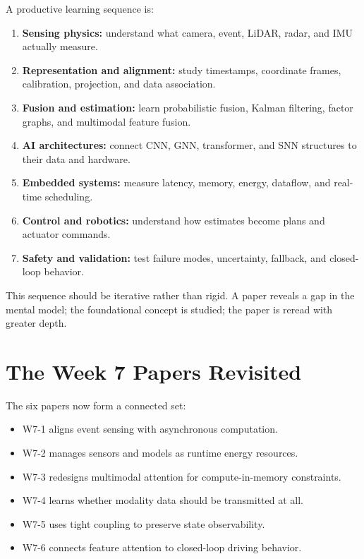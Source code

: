 A productive learning sequence is:

\begin{enumerate}[label=\arabic*.]
    \item \textbf{Sensing physics:} understand what camera, event, LiDAR, radar, and IMU actually measure.
    \item \textbf{Representation and alignment:} study timestamps, coordinate frames, calibration, projection, and data association.
    \item \textbf{Fusion and estimation:} learn probabilistic fusion, Kalman filtering, factor graphs, and multimodal feature fusion.
    \item \textbf{AI architectures:} connect CNN, GNN, transformer, and SNN structures to their data and hardware.
    \item \textbf{Embedded systems:} measure latency, memory, energy, dataflow, and real-time scheduling.
    \item \textbf{Control and robotics:} understand how estimates become plans and actuator commands.
    \item \textbf{Safety and validation:} test failure modes, uncertainty, fallback, and closed-loop behavior.
\end{enumerate}

This sequence should be iterative rather than rigid. A paper reveals a gap in the mental model; the foundational concept is studied; the paper is reread with greater depth.

\section{The Week 7 Papers Revisited}

The six papers now form a connected set:

\begin{itemize}
    \item W7-1 aligns event sensing with asynchronous computation.
    \item W7-2 manages sensors and models as runtime energy resources.
    \item W7-3 redesigns multimodal attention for compute-in-memory constraints.
    \item W7-4 learns whether modality data should be transmitted at all.
    \item W7-5 uses tight coupling to preserve state observability.
    \item W7-6 connects feature attention to closed-loop driving behavior.
\end{itemize}


